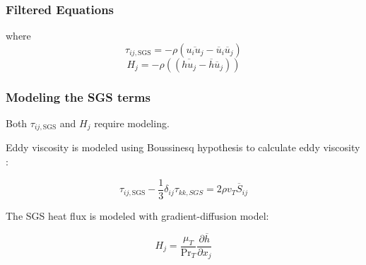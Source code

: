 \documentclass{beamer}
\begin{document}
  \begin{frame}
    \frametitle{Filtered Equations}
  \pause
    where 
\begin{equation}
  \tau_{ij, \text{SGS}}=-\rho (\overline{u_i u_j}-\overline{u}_i \overline{u}_j)
\end{equation}
\pause
\begin{equation}
  H_j=-\rho((\overline{h u_j}-\overline{h} \overline{u}_j))
\end{equation}

\end{frame}

\begin{frame}
  \frametitle{Modeling the SGS terms}
  \pause

  Both $\tau_{ij, \text{SGS}}$ and $H_j$ require modeling.\\
  \pause

  Eddy viscosity is modeled using Boussinesq hypothesis to calculate eddy viscosity \cite{zouLARGEEDDYSIMULATION2006}:
  \pause

  \begin{equation}
  \tau_{ij,\text{SGS}} - \frac{1}{3}\delta_{ij}\tau_{kk,SGS} =  2\rho v_T \overline{S}_{ij}
\end{equation}
\pause

The SGS heat flux is modeled with gradient-diffusion model\cite{zouLARGEEDDYSIMULATION2006}:
\pause

\begin{equation}
  H_j = \frac{\mu_T}{\text{Pr}_T} \frac{\partial \overline{h}}{\partial x_j}
\end{equation}
\end{frame}

\begin{frame}
  
   
  
\end{frame}
\end{document}

